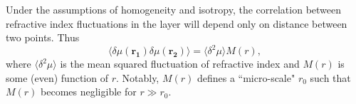 Under the assumptions of homogeneity and isotropy, the correlation between refractive index fluctuations in the layer will depend only on distance between two points. Thus
\begin{equation}
\label{eq:scattering_correlation}
\langle \delta \mu(\mathbf{r_1}) \delta \mu(\mathbf{r_2}) \rangle = \langle \delta^2 \mu \rangle M(r),
\end{equation}
where $\langle \delta^2 \mu \rangle$ is the mean squared fluctuation of refractive index and $M(r)$ is some (even) function of $r$. 
Notably, $M(r)$ defines a ``micro-scale" $r_0$ such that $M(r)$ becomes negligible for $r \gg r_0$.	
 
